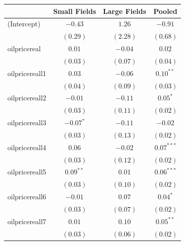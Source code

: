 \documentclass[12pt]{article}
\begin{document}

\begin{table}
\begin{center}
\begin{tabular}{l c c c }
\hline
                                     & Small Fields & Large Fields & Pooled \\
\hline
(Intercept)                          & $-0.43$       & $1.26$        & $-0.91$       \\
                                     & $(0.29)$      & $(2.28)$      & $(0.68)$      \\
oilpricereal                       & $0.01$        & $-0.04$       & $0.02$        \\
                                     & $(0.03)$      & $(0.07)$      & $(0.04)$      \\
oilpricereall1                    & $0.03$        & $-0.06$       & $0.10^{**}$   \\
                                     & $(0.04)$      & $(0.09)$      & $(0.03)$      \\
oilpricereall2                    & $-0.01$       & $-0.11$       & $0.05^{*}$    \\
                                     & $(0.03)$      & $(0.11)$      & $(0.02)$      \\
oilpricereall3                    & $-0.07^{*}$   & $-0.11$       & $-0.02$       \\
                                     & $(0.03)$      & $(0.13)$      & $(0.02)$      \\
oilpricereall4                    & $0.06$        & $-0.02$       & $0.07^{***}$  \\
                                     & $(0.03)$      & $(0.12)$      & $(0.02)$      \\
oilpricereall5                    & $0.09^{**}$   & $0.01$        & $0.06^{***}$  \\
                                     & $(0.03)$      & $(0.10)$      & $(0.02)$      \\
oilpricereall6                    & $-0.01$       & $0.07$        & $0.04^{*}$    \\
                                     & $(0.03)$      & $(0.07)$      & $(0.02)$      \\
oilpricereall7                    & $0.01$        & $0.10$        & $0.05^{**}$   \\
                                     & $(0.03)$      & $(0.06)$      & $(0.02)$      \\

\end{tabular}
\end{center}
\end{table}
\end{document}

